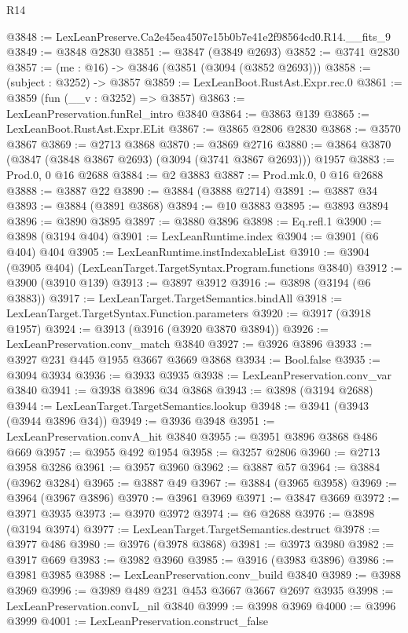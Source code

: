 \begin{lexlean}{R14}
\begin{coremodule}
@3848 := LexLeanPreserve.Ca2e45ea4507e15b0b7e41e2f98564cd0.R14.__fits_9
@3849 := @3848 @2830
@3851 := @3847 (@3849 @2693)
@3852 := @3741 @2830
@3857 := (me : @16) -> @3846 (@3851 (@3094 (@3852 @2693)))
@3858 := (subject : @3252) -> @3857
@3859 := LexLeanBoot.RustAst.Expr.rec.{0}
@3861 := @3859 (fun (__v : @3252) => @3857)
@3863 := LexLeanPreservation.funRel_intro @3840
@3864 := @3863 @139
@3865 := LexLeanBoot.RustAst.Expr.ELit
@3867 := @3865 @2806 @2830
@3868 := @3570 @3867
@3869 := @2713 @3868
@3870 := @3869 @2716
@3880 := @3864 @3870 (@3847 (@3848 @3867 @2693) (@3094 (@3741 @3867 @2693))) @1957
@3883 := Prod.{0, 0} @16 @2688
@3884 := @2 @3883
@3887 := Prod.mk.{0, 0} @16 @2688
@3888 := @3887 @22
@3890 := @3884 (@3888 @2714)
@3891 := @3887 @34
@3893 := @3884 (@3891 @3868)
@3894 := @10 @3883
@3895 := @3893 @3894
@3896 := @3890 @3895
@3897 := @3880 @3896
@3898 := Eq.refl.{1}
@3900 := @3898 (@3194 @404)
@3901 := LexLeanRuntime.index
@3904 := @3901 (@6 @404) @404
@3905 := LexLeanRuntime.instIndexableList
@3910 := @3904 (@3905 @404) (LexLeanTarget.TargetSyntax.Program.functions @3840)
@3912 := @3900 (@3910 @139)
@3913 := @3897 @3912
@3916 := @3898 (@3194 (@6 @3883))
@3917 := LexLeanTarget.TargetSemantics.bindAll
@3918 := LexLeanTarget.TargetSyntax.Function.parameters
@3920 := @3917 (@3918 @1957)
@3924 := @3913 (@3916 (@3920 @3870 @3894))
@3926 := LexLeanPreservation.conv_match @3840
@3927 := @3926 @3896
@3933 := @3927 @231 @445 @1955 @3667 @3669 @3868
@3934 := Bool.false
@3935 := @3094 @3934
@3936 := @3933 @3935
@3938 := LexLeanPreservation.conv_var @3840
@3941 := @3938 @3896 @34 @3868
@3943 := @3898 (@3194 @2688)
@3944 := LexLeanTarget.TargetSemantics.lookup
@3948 := @3941 (@3943 (@3944 @3896 @34))
@3949 := @3936 @3948
@3951 := LexLeanPreservation.convA_hit @3840
@3955 := @3951 @3896 @3868 @486 @669
@3957 := @3955 @492 @1954
@3958 := @3257 @2806
@3960 := @2713 @3958 @3286
@3961 := @3957 @3960
@3962 := @3887 @57
@3964 := @3884 (@3962 @3284)
@3965 := @3887 @49
@3967 := @3884 (@3965 @3958)
@3969 := @3964 (@3967 @3896)
@3970 := @3961 @3969
@3971 := @3847 @3669
@3972 := @3971 @3935
@3973 := @3970 @3972
@3974 := @6 @2688
@3976 := @3898 (@3194 @3974)
@3977 := LexLeanTarget.TargetSemantics.destruct
@3978 := @3977 @486
@3980 := @3976 (@3978 @3868)
@3981 := @3973 @3980
@3982 := @3917 @669
@3983 := @3982 @3960
@3985 := @3916 (@3983 @3896)
@3986 := @3981 @3985
@3988 := LexLeanPreservation.conv_build @3840
@3989 := @3988 @3969
@3996 := @3989 @489 @231 @453 @3667 @3667 @2697 @3935
@3998 := LexLeanPreservation.convL_nil @3840
@3999 := @3998 @3969
@4000 := @3996 @3999
@4001 := LexLeanPreservation.construct_false

\end{coremodule}
\end{lexlean}

